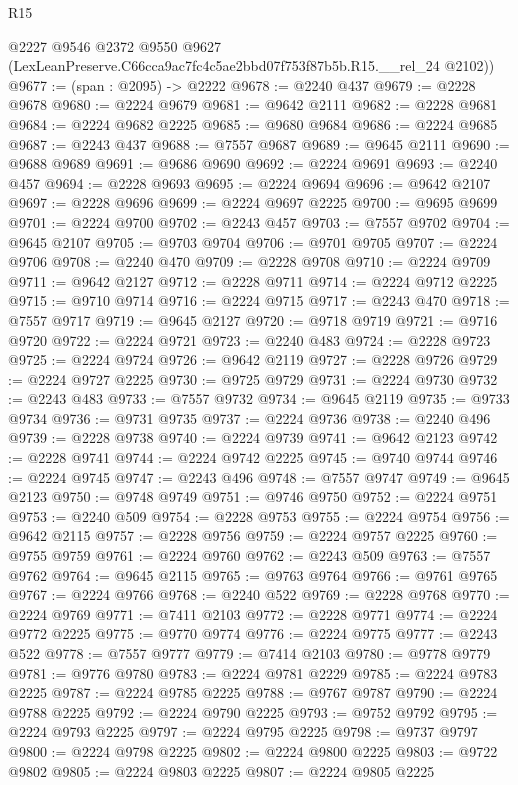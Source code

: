 \begin{lexlean}{R15}
\begin{coremodule}
      @2227
      @9546
      @2372
      @9550
      @9627
      (LexLeanPreserve.C66cca9ac7fc4c5ae2bbd07f753f87b5b.R15.__rel_24 @2102))
@9677 := (span : @2095) -> @2222
@9678 := @2240 @437
@9679 := @2228 @9678
@9680 := @2224 @9679
@9681 := @9642 @2111
@9682 := @2228 @9681
@9684 := @2224 @9682 @2225
@9685 := @9680 @9684
@9686 := @2224 @9685
@9687 := @2243 @437
@9688 := @7557 @9687
@9689 := @9645 @2111
@9690 := @9688 @9689
@9691 := @9686 @9690
@9692 := @2224 @9691
@9693 := @2240 @457
@9694 := @2228 @9693
@9695 := @2224 @9694
@9696 := @9642 @2107
@9697 := @2228 @9696
@9699 := @2224 @9697 @2225
@9700 := @9695 @9699
@9701 := @2224 @9700
@9702 := @2243 @457
@9703 := @7557 @9702
@9704 := @9645 @2107
@9705 := @9703 @9704
@9706 := @9701 @9705
@9707 := @2224 @9706
@9708 := @2240 @470
@9709 := @2228 @9708
@9710 := @2224 @9709
@9711 := @9642 @2127
@9712 := @2228 @9711
@9714 := @2224 @9712 @2225
@9715 := @9710 @9714
@9716 := @2224 @9715
@9717 := @2243 @470
@9718 := @7557 @9717
@9719 := @9645 @2127
@9720 := @9718 @9719
@9721 := @9716 @9720
@9722 := @2224 @9721
@9723 := @2240 @483
@9724 := @2228 @9723
@9725 := @2224 @9724
@9726 := @9642 @2119
@9727 := @2228 @9726
@9729 := @2224 @9727 @2225
@9730 := @9725 @9729
@9731 := @2224 @9730
@9732 := @2243 @483
@9733 := @7557 @9732
@9734 := @9645 @2119
@9735 := @9733 @9734
@9736 := @9731 @9735
@9737 := @2224 @9736
@9738 := @2240 @496
@9739 := @2228 @9738
@9740 := @2224 @9739
@9741 := @9642 @2123
@9742 := @2228 @9741
@9744 := @2224 @9742 @2225
@9745 := @9740 @9744
@9746 := @2224 @9745
@9747 := @2243 @496
@9748 := @7557 @9747
@9749 := @9645 @2123
@9750 := @9748 @9749
@9751 := @9746 @9750
@9752 := @2224 @9751
@9753 := @2240 @509
@9754 := @2228 @9753
@9755 := @2224 @9754
@9756 := @9642 @2115
@9757 := @2228 @9756
@9759 := @2224 @9757 @2225
@9760 := @9755 @9759
@9761 := @2224 @9760
@9762 := @2243 @509
@9763 := @7557 @9762
@9764 := @9645 @2115
@9765 := @9763 @9764
@9766 := @9761 @9765
@9767 := @2224 @9766
@9768 := @2240 @522
@9769 := @2228 @9768
@9770 := @2224 @9769
@9771 := @7411 @2103
@9772 := @2228 @9771
@9774 := @2224 @9772 @2225
@9775 := @9770 @9774
@9776 := @2224 @9775
@9777 := @2243 @522
@9778 := @7557 @9777
@9779 := @7414 @2103
@9780 := @9778 @9779
@9781 := @9776 @9780
@9783 := @2224 @9781 @2229
@9785 := @2224 @9783 @2225
@9787 := @2224 @9785 @2225
@9788 := @9767 @9787
@9790 := @2224 @9788 @2225
@9792 := @2224 @9790 @2225
@9793 := @9752 @9792
@9795 := @2224 @9793 @2225
@9797 := @2224 @9795 @2225
@9798 := @9737 @9797
@9800 := @2224 @9798 @2225
@9802 := @2224 @9800 @2225
@9803 := @9722 @9802
@9805 := @2224 @9803 @2225
@9807 := @2224 @9805 @2225

\end{coremodule}
\end{lexlean}
